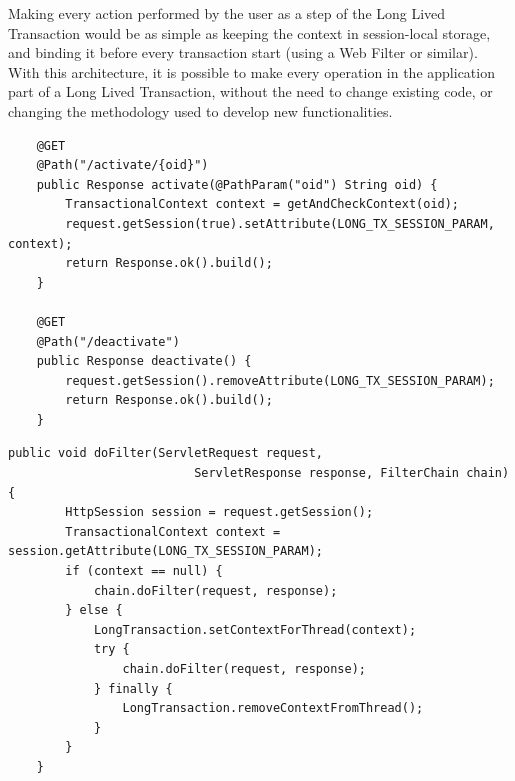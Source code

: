 Making every action performed by the user as a step of the Long Lived
Transaction would be as simple as keeping the context in session-local
storage, and binding it before every transaction start (using a Web
Filter or similar). With this architecture, it is possible to make
every operation in the application part of a Long Lived Transaction,
without the need to change existing code, or changing the methodology
used to develop new functionalities.

\begin{lstlisting}
    @GET
    @Path("/activate/{oid}")
    public Response activate(@PathParam("oid") String oid) {
        TransactionalContext context = getAndCheckContext(oid);
        request.getSession(true).setAttribute(LONG_TX_SESSION_PARAM, context);
        return Response.ok().build();
    }
    
    @GET
    @Path("/deactivate")
    public Response deactivate() {
        request.getSession().removeAttribute(LONG_TX_SESSION_PARAM);
        return Response.ok().build();
    }
\end{lstlisting}

\begin{lstlisting}
public void doFilter(ServletRequest request, 
                          ServletResponse response, FilterChain chain) {
        HttpSession session = request.getSession();
        TransactionalContext context = session.getAttribute(LONG_TX_SESSION_PARAM);
        if (context == null) {
            chain.doFilter(request, response);
        } else {
            LongTransaction.setContextForThread(context);
            try {
                chain.doFilter(request, response);
            } finally {
                LongTransaction.removeContextFromThread();
            }
        }
    }
\end{lstlisting}